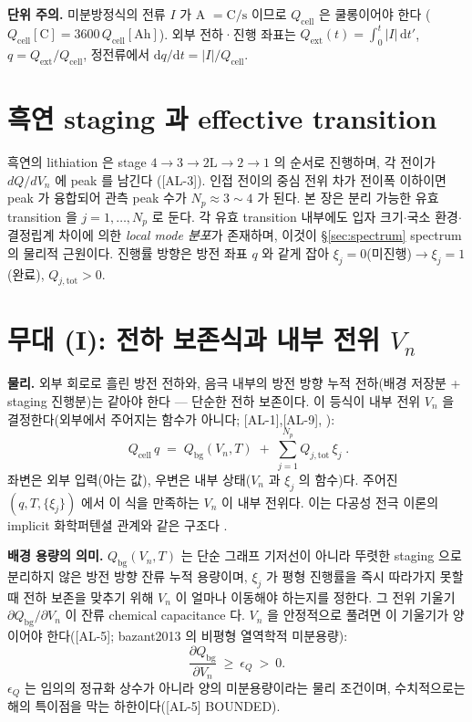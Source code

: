 \documentclass[11pt,a4paper]{article}
\newcommand{\dd}{\mathrm{d}}
\newcommand{\bg}{\mathrm{bg}}
\newcommand{\cell}{\mathrm{cell}}
\newcommand{\ext}{\mathrm{ext}}
\newcommand{\tot}{\mathrm{tot}}
\newcommand{\AL}[1]{\textsf{[AL-#1]}}
\begin{document}
\textbf{단위 주의.} 미분방정식의 전류 $I$ 가 A $=\mathrm{C/s}$ 이므로 $Q_\cell$ 은 쿨롱이어야 한다
($Q_\cell[\mathrm C]=3600\,Q_\cell[\mathrm{Ah}]$). 외부 전하·진행 좌표는 $Q_\ext(t)=\int_0^t|I|\,\dd t'$,
$q=Q_\ext/Q_\cell$, 정전류에서 $\dd q/\dd t=|I|/Q_\cell$.

\section{흑연 staging 과 effective transition}\label{sec:staging}
흑연의 lithiation 은 stage $4\to3\to2\mathrm L\to2\to1$ 의 순서로 진행하며, 각 전이가 $dQ/dV_n$ 에 peak 를
남긴다 \cite{dahn1991,ohzuku1993,funabiki1999ea,funabiki1999jes}(\AL{3}). 인접 전이의 중심 전위 차가
전이폭 이하이면 peak 가 융합되어 관측 peak 수가 $N_p\approx3\sim4$ 가 된다. 본 장은 분리 가능한 유효
transition 을 $j=1,\dots,N_p$ 로 둔다. 각 유효 transition 내부에도 입자 크기$\cdot$국소 환경$\cdot$결정립계
차이에 의한 \emph{local mode 분포}가 존재하며, 이것이 \S\ref{sec:spectrum} spectrum 의 물리적 근원이다.
진행률 방향은 방전 좌표 $q$ 와 같게 잡아 $\xi_j=0$(미진행)$\to\xi_j=1$(완료), $Q_{j,\tot}>0$.

\section{무대 (I): 전하 보존식과 내부 전위 $V_n$}\label{sec:charge}
\textbf{물리.} 외부 회로로 흘린 방전 전하와, 음극 내부의 방전 방향 누적 전하(배경 저장분 + staging 진행분)는
같아야 한다 — 단순한 전하 보존이다. 이 등식이 내부 전위 $V_n$ 을 결정한다(외부에서 주어지는 함수가
아니다; \AL{1},\AL{9}, \cite{doyle1993,newman}):
\begin{equation}
\boxed{\;Q_\cell\,q \;=\; Q_\bg(V_n,T) \;+\; \sum_{j=1}^{N_p} Q_{j,\tot}\,\xi_j\;.}
\label{eq:charge_balance}
\end{equation}
좌변은 외부 입력(아는 값), 우변은 내부 상태($V_n$ 과 $\xi_j$ 의 함수)다. 주어진 $(q,T,\{\xi_j\})$ 에서 이
식을 만족하는 $V_n$ 이 내부 전위다. 이는 다공성 전극 이론의 implicit 화학퍼텐셜 관계와 같은 구조다
\cite{doyle1993,newman}.

\textbf{배경 용량의 의미.} $Q_\bg(V_n,T)$ 는 단순 그래프 기저선이 아니라 뚜렷한 staging 으로 분리하지 않은
방전 방향 잔류 누적 용량이며, $\xi_j$ 가 평형 진행률을 즉시 따라가지 못할 때 전하 보존을 맞추기 위해 $V_n$
이 얼마나 이동해야 하는지를 정한다. 그 전위 기울기 $\partial Q_\bg/\partial V_n$ 이 잔류 chemical
capacitance 다. $V_n$ 을 안정적으로 풀려면 이 기울기가 양이어야 한다(\AL{5}; bazant2013 의 비평형
열역학적 미분용량):
\begin{equation}
\frac{\partial Q_\bg}{\partial V_n}\ \ge\ \epsilon_Q\ >\ 0 .
\label{eq:monotone}
\end{equation}
$\epsilon_Q$ 는 임의의 정규화 상수가 아니라 양의 미분용량이라는 물리 조건이며, 수치적으로는 해의 특이점을
막는 하한이다(\AL{5} BOUNDED).
\end{document}
